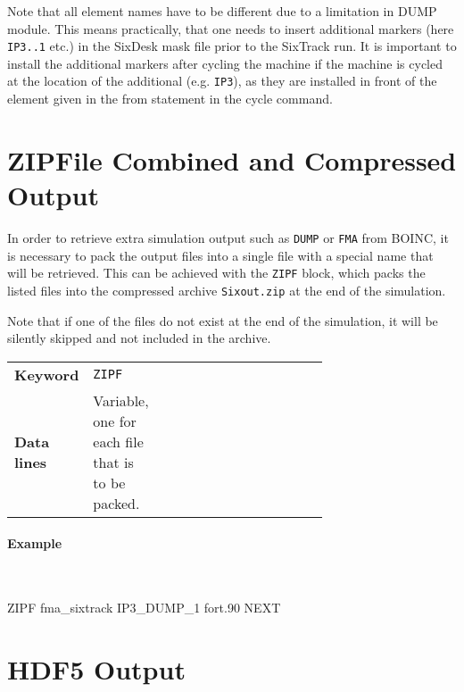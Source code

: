 Note that all element names have to be different due to a limitation in DUMP module. This means practically, that one needs to insert additional markers (here \texttt{IP3..1} etc.) in the SixDesk \cite{sixdesk1,sixdesk2} mask file prior to the SixTrack run. It is important to install the additional markers after cycling the machine if the machine is cycled at the location of the additional (e.g. \texttt{IP3}), as they are installed in front of the element given in the from statement in the cycle command.

\section{ZIPFile Combined and Compressed Output} \label{sec:ZIPF}

In order to retrieve extra simulation output such as \texttt{DUMP} or \texttt{FMA} from BOINC, it is necessary to pack the output files into a single file with a special name that will be retrieved.
This can be achieved with the \texttt{ZIPF} block, which packs the listed files into the compressed archive \texttt{Sixout.zip} at the end of the simulation.

Note that if one of the files do not exist at the end of the simulation, it will be silently skipped and not included in the archive.

\bigskip
\begin{tabular}{@{}llp{0.7\linewidth}}
    \textbf{Keyword}    & \texttt{ZIPF} \\
    \textbf{Data lines} & Variable, one for each file that is to be packed. \\
\end{tabular}

\paragraph{Example}~
\begin{cverbatim}
ZIPF
fma_sixtrack
IP3_DUMP_1
fort.90
NEXT
\end{cverbatim}

\section{HDF5 Output} \label{sec:HDF5}

